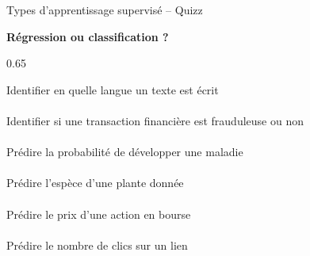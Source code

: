 \documentclass[10pt]{beamer}
\begin{document}
\begin{frame}{Types d'apprentissage supervisé -- Quizz}
	
\begin{center}
\large \textbf{	Régression ou classification ?}\\[1em]
\normalsize
	\begin{minipt}[01]{0.65} \hfill
	
	Identifier en quelle langue un texte est écrit \\
	\\[0.5em]
	Identifier si une transaction financière est frauduleuse ou non \\
	\\[0.5em]
	Prédire la probabilité de développer une maladie \\
	\\[0.5em]
	Prédire l'espèce d'une plante donnée\\
	\\[0.5em]
	Prédire le prix d’une action en bourse\\
	\\[0.5em]
	Prédire le nombre de clics sur un lien\\	
\\[0.5em]		
\end{minipt}
\end{center}
\end{frame}
\end{document}
